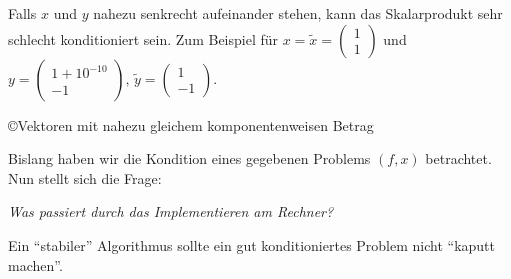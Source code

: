 \begin{Bspe}
\begin{enumerate}[a)]
    Falls $x$ und $y$ nahezu senkrecht aufeinander stehen, 
    kann das Skalarprodukt sehr schlecht konditioniert sein. 
    Zum Beispiel für $x=\tilde{x} = \begin{pmatrix} 1 \\1 \end{pmatrix}$
    und $y=\begin{pmatrix} 1+10^{-10} \\-1 \end{pmatrix},
    \, \widetilde{y}=\begin{pmatrix} 1 \\-1 \end{pmatrix}$. \\
    \begin{image}{\copyright Vektoren mit nahezu gleichem komponentenweisen Betrag}
    \end{image}
  \end{enumerate}	
\end{Bspe}

Bislang haben wir die Kondition eines gegebenen Problems $(f,x)$ betrachtet.
Nun stellt sich die Frage:

\textit{Was passiert durch das Implementieren am Rechner? }

Ein \enquote{stabiler} Algorithmus sollte ein gut konditioniertes
Problem nicht \enquote{kaputt machen}.

